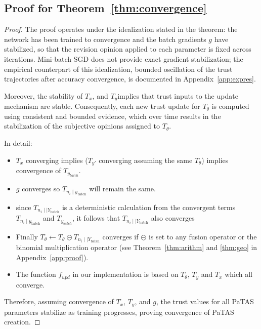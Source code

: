 \subsection{Proof for Theorem~\ref{thm:convergence}}
\begin{proof}
The proof operates under the idealization stated in the theorem: the network has been trained to convergence and the batch gradients \( g \) have stabilized, so that the revision opinion applied to each parameter is fixed across iterations. Mini-batch SGD does not provide exact gradient stabilization; the empirical counterpart of this idealization, bounded oscillation of the trust trajectories after accuracy convergence, is documented in Appendix~\ref{app:expres}.

Moreover, the stability of \( T_x \), and \( T_y \)implies that trust inputs to the update mechanism are stable. Consequently, each new trust update for \( T_{\theta} \) is computed using consistent and bounded evidence, which over time results in the stabilization of the subjective opinions assigned to \( T_{\theta} \).

In detail:
\begin{itemize}
    \item \(T_x\) converging implies (\(T_{y\prime}\) converging assuming the same \(T_\theta\)) implies convergence of \(T_{y_{batch}}\).

    \item \(g\) converges so \(T_{n_i \mid y_\text{batch}}\) will remain the same. 
    
    \item since \(T_{n_i\mid \mid {Y_\text{batch}}}\) is a deterministic calculation from the convergent terms  \(T_{n_i \mid y_\text{batch}}\) and \(T_{y_{batch}}\), it follows that \(T_{n_i\mid \mid {Y_\text{batch}}}\) also converges 

    \item Finally \(T_{\theta} \longleftarrow T_{\theta} \circleddash T_{n_i\mid \mid {Y_\text{batch}}}\) converges if \(\circleddash\) is set to any fusion operator or the binomial multiplication operator (see Theorem~\ref{thm:arithm} and \ref{thm:geo} in Appendix~\ref{app:proof}). 

    \item The function \(f_{upd}\) in our implementation is based on \(T_{\theta}\), \(T_{y}\) and \({T_{x}}\) which all converge.
\end{itemize}

Therefore, assuming convergence of $T_x$, $T_y$, and $g$, the trust values for all PaTAS parameters stabilize as training progresses, proving convergence of PaTAS creation. 
\end{proof}

